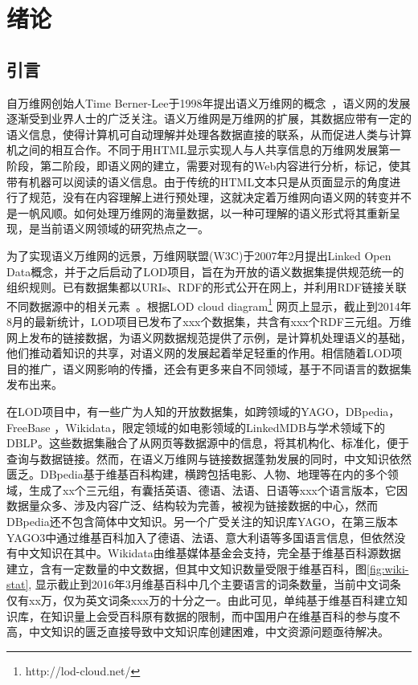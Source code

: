 \chapter{绪论}
\label{cha:intro}

\section{引言}

自万维网创始人Time Berner-Lee于1998年提出语义万维网的概念~\cite{berners1998semantic}，语义网的发展逐渐受到业界人士的广泛关注。语义万维网是万维网的扩展，其数据应带有一定的语义信息，使得计算机可自动理解并处理各数据直接的联系，从而促进人类与计算机之间的相互合作。不同于用HTML显示实现人与人共享信息的万维网发展第一阶段，第二阶段，即语义网的建立，需要对现有的Web内容进行分析，标记，使其带有机器可以阅读的语义信息。由于传统的HTML文本只是从页面显示的角度进行了规范，没有在内容理解上进行预处理，这就决定着万维网向语义网的转变并不是一帆风顺。如何处理万维网的海量数据，以一种可理解的语义形式将其重新呈现，是当前语义网领域的研究热点之一。

为了实现语义万维网的远景，万维网联盟(W3C)于2007年2月提出Linked Open Data概念，并于之后启动了LOD项目，旨在为开放的语义数据集提供规范统一的组织规则。已有数据集都以URIs、RDF的形式公开在网上，并利用RDF链接关联不同数据源中的相关元素~\cite{bizer2009linked}。根据LOD cloud diagram\footnote{http://lod-cloud.net/} 网页上显示，截止到2014年8月的最新统计，LOD项目已发布了xxx个数据集，共含有xxx个RDF三元组。万维网上发布的链接数据，为语义网数据规范提供了示例，是计算机处理语义的基础，他们推动着知识的共享，对语义网的发展起着举足轻重的作用。相信随着LOD项目的推广，语义网影响的传播，还会有更多来自不同领域，基于不同语言的数据集发布出来。

在LOD项目中，有一些广为人知的开放数据集，如跨领域的YAGO\cite{suchanek2007yago, suchanek2008yago, hoffart2013yago2, mahdisoltani2014yago3 }，DBpedia\cite{auer2007dbpedia, bizer2009dbpedia, lehmann2015dbpedia}，FreeBase \cite{bollacker2008freebase}，Wikidata\cite{vrandevcic2014wikidata, erxleben2014introducing}，限定领域的如电影领域的LinkedMDB\cite{hassanzadeh2009linked}与学术领域下的DBLP。这些数据集融合了从网页等数据源中的信息，将其机构化、标准化，便于查询与数据链接。然而，在语义万维网与链接数据蓬勃发展的同时，中文知识依然匮乏。DBpedia基于维基百科构建，横跨包括电影、人物、地理等在内的多个领域，生成了xx个三元组，有囊括英语、德语、法语、日语等xxx个语言版本，它因数据量众多、涉及内容广泛、结构较为完善，被视为链接数据的中心，然而DBpedia还不包含简体中文知识。另一个广受关注的知识库YAGO，在第三版本YAGO3中通过维基百科加入了德语、法语、意大利语等多国语言信息，但依然没有中文知识在其中。Wikidata由维基媒体基金会支持，完全基于维基百科源数据建立，含有一定数量的中文数据，但其中文知识数量受限于维基百科，图\ref{fig:wiki-stat}, 显示截止到2016年3月维基百科中几个主要语言的词条数量，当前中文词条仅有xx万，仅为英文词条xxx万的十分之一。由此可见，单纯基于维基百科建立知识库，在知识量上会受百科原有数据的限制，而中国用户在维基百科的参与度不高，中文知识的匮乏直接导致中文知识库创建困难，中文资源问题亟待解决。

